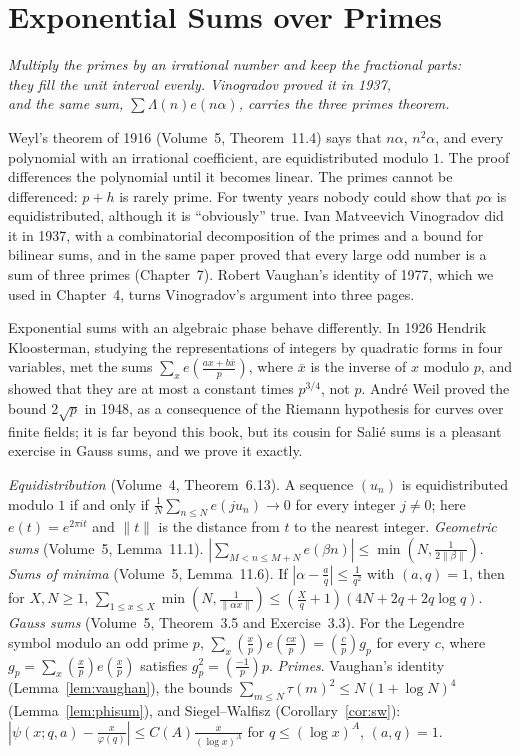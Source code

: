 \chapter{Exponential Sums over Primes}
\begin{center}\itshape
Multiply the primes by an irrational number and keep the fractional parts:\\
they fill the unit interval evenly. Vinogradov proved it in 1937,\\
and the same sum, $\sum\Lambda(n)e(n\alpha)$, carries the three primes theorem.
\end{center}

Weyl's theorem of 1916 (Volume~5, Theorem~11.4) says that $n\alpha$, $n^2\alpha$, and every polynomial with an irrational coefficient, are equidistributed modulo $1$. The proof differences the polynomial until it becomes linear. The primes cannot be differenced: $p+h$ is rarely prime. For twenty years nobody could show that $p\alpha$ is equidistributed, although it is ``obviously'' true. Ivan Matveevich Vinogradov did it in 1937, with a combinatorial decomposition of the primes and a bound for bilinear sums, and in the same paper proved that every large odd number is a sum of three primes (Chapter~7). Robert Vaughan's identity of 1977, which we used in Chapter~4, turns Vinogradov's argument into three pages.

Exponential sums with an algebraic phase behave differently. In 1926 Hendrik Kloosterman, studying the representations of integers by quadratic forms in four variables, met the sums $\sum_xe(\frac{ax+b\overline x}p)$, where $\overline x$ is the inverse of $x$ modulo $p$, and showed that they are at most a constant times $p^{3/4}$, not $p$. André Weil proved the bound $2\sqrt p$ in 1948, as a consequence of the Riemann hypothesis for curves over finite fields; it is far beyond this book, but its cousin for Salié sums is a pleasant exercise in Gauss sums, and we prove it exactly.

\begin{reminder}
\emph{Equidistribution} (Volume~4, Theorem~6.13). A sequence $(u_n)$ is equidistributed modulo $1$ if and only if $\frac1N\sum_{n\le N}e(ju_n)\to0$ for every integer $j\ne0$; here $e(t)=e^{2\pi it}$ and $\|t\|$ is the distance from $t$ to the nearest integer.
\emph{Geometric sums} (Volume~5, Lemma~11.1). $|\sum_{M<n\le M+N}e(\beta n)|\le\min(N,\frac1{2\|\beta\|})$.
\emph{Sums of minima} (Volume~5, Lemma~11.6). If $|\alpha-\frac aq|\le\frac1{q^2}$ with $(a,q)=1$, then for $X,N\ge1$,
$\sum_{1\le x\le X}\min(N,\frac1{\|\alpha x\|})\le(\frac Xq+1)(4N+2q+2q\log q)$.
\emph{Gauss sums} (Volume~5, Theorem~3.5 and Exercise~3.3). For the Legendre symbol modulo an odd prime $p$, $\sum_x(\frac xp)e(\frac{cx}p)=(\frac cp)g_p$ for every $c$, where $g_p=\sum_x(\frac xp)e(\frac xp)$ satisfies $g_p^2=(\frac{-1}p)p$.
\emph{Primes}. Vaughan's identity (Lemma~\ref{lem:vaughan}), the bounds $\sum_{m\le N}\tau(m)^2\le N(1+\log N)^4$ (Lemma~\ref{lem:phisum}), and Siegel--Walfisz (Corollary~\ref{cor:sw}): $|\psi(x;q,a)-\frac x{\varphi(q)}|\le C(A)\frac x{(\log x)^A}$ for $q\le(\log x)^A$, $(a,q)=1$.
\end{reminder}

